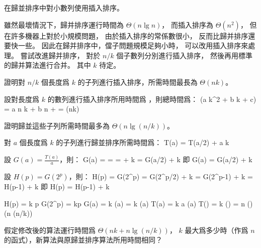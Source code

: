 \startsubject[
  title={Problems},
]
\startPROBLEM
在歸並排序中對小數列使用插入排序。

雖然最壞情況下，歸并排序運行時間為 $\Theta(n\lg n)$，
而插入排序為 $\Theta(n^2)$，
但在許多機器上對於小規模問題，
由於插入排序的常係數很小，
反而比歸并排序還要快一些。
因此在歸并排序中，儅子問題規模足夠小時，
可以改用插入排序來處理。
嘗試改進歸并排序，
對於 $n/k$ 個子數列分別進行插入排序，
然後再用標準的歸并算法進行合并。
其中 $k$ 待定。
\startigBase[a]

\item 證明對 $n/k$ 個長度爲 $k$ 的子列進行插入排序，所需時間最長為 $\Theta(nk)$。

\startANSWER
設對長度爲 $k$ 的數列進行插入排序所用時間爲 ，則總時間爲：
\startformula
{}(a k^2 + b k + c) = a n k + b n +  = \Theta(nk)
\stopformula
\stopANSWER

\item 證明歸並這些子列所需時間最多為 $\Theta(n \lg(n/k))$。

\startANSWER
對 $a$ 個長度爲 $k$ 的子列進行歸並排序所需時間爲：
\startformula
T(a) = \startcases
{}	\NC {} \NR
{} T(a/2) + a k \NC {} \NR
\stopcases
\stopformula

設 $G(a) = \frac{T(a)}{a}$，則：
\startsplitformula\startalign
\NC G(a)	\NC =  \NR
\NC 		\NC =  \NR
\NC		\NC =  + k \NR
\NC		\NC = G(a/2) + k \NR
\stopalign\stopsplitformula
即
\startformula
G(a) = \startcases
{}	\NC {}\NR
\NC G(a/2) + k \NC {} \NR
\stopcases
\stopformula

設 $H(p) = G(2^p)$，則：
\startsplitformula\startalign
\NC H(p)	\NC = G(2^p) \NR
\NC		\NC = G(2^p/2) + k \NR
\NC		\NC = G(2^{p-1}) + k \NR
\NC		\NC = H(p-1) + k \NR
\stopalign\stopsplitformula
即
\startformula
H(p) = \startcases
{}	\NC {} \NR
\NC H(p-1) + k \NC {} \NR
\stopcases
\stopformula

\startsplitformula\startalign
\NC H(p) \NC = k p \NR
\NC G(2^p) \NC = kp \NR
\NC G(a) \NC = k \lg(a) \NR
\NC {} \NC = k \lg(a) \NR
\NC T(a) \NC = k a \lg(a) \NR
\NC T() \NC = k  \lg() \NR
\NC		\NC = n \lg() \NR
\NC     \NC \Theta(n \lg(n/k)) \NR
\stopalign\stopsplitformula
\stopANSWER

\item 假定修改後的算法運行時間爲 $\Theta(nk+n \lg(n/k))$，
$k$ 最大爲多少時（作爲 $n$ 的函式），新算法與原歸並排序算法所用時間相同？

